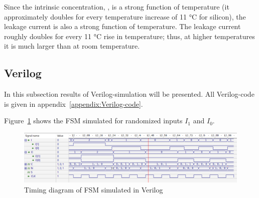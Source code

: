 \begin{table}[H]
\centering
\caption{Static Power Consumption}
\label{tab:power}
\end{table}

Since the intrinsic concentration, , is a strong function of temperature (it approximately doubles for every
temperature increase of 11 °C for silicon), the leakage current is also a strong function of temperature. The leakage
current roughly doubles for every 11 °C rise in temperature; thus, at higher temperatures it is much larger than at
room temperature.

\subsection{Verilog}

In this subsection results of Verilog-simulation will be presented. All Verilog-code is given in appendix~\ref{appendix:Verilog-code}.

Figure~\ref{fig:fsm_simulation} shows the FSM simulated for randomized inputs $I_1$ and $I_0$.

\begin{figure}[H]
    \centering
    \includegraphics[width=\textwidth]{Figures/Test of FSM.png}
    \caption{Timing diagram of FSM simulated in Verilog}
    \label{fig:fsm_simulation}
\end{figure}


